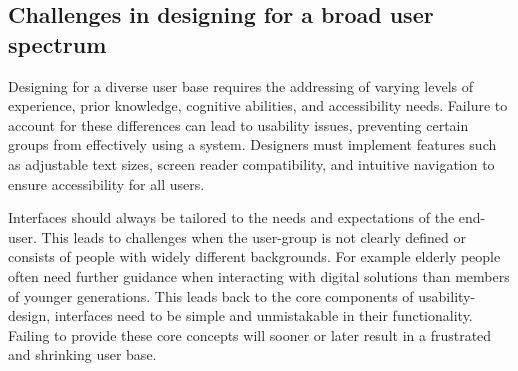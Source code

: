 \blankLine

\subsection{Challenges in designing for a broad user spectrum}

Designing for a diverse user base requires the addressing of varying levels of experience, prior knowledge, cognitive abilities, and accessibility needs. Failure to account for these differences can lead to usability issues, preventing certain groups from effectively using a system. Designers must implement features such as adjustable text sizes, screen reader compatibility, and intuitive navigation to ensure accessibility for all users.

\blankLine


Interfaces should always be tailored to the needs and expectations of the end-user. This leads to challenges when the user-group is not clearly defined or consists of people with widely different backgrounds. For example elderly people often need further guidance when interacting with digital solutions than members of younger generations. This leads back to the core components of usability-design, interfaces need to be simple and unmistakable in their functionality. Failing to provide these core concepts will sooner or later result in a frustrated and shrinking user base. 
\autocite{Paul:UIUXIntroduction}

\newpage